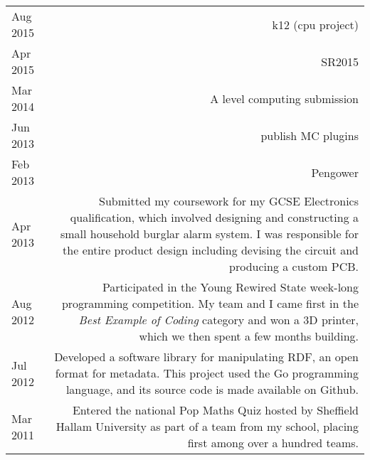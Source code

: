 

\begin{tabular}{L!{\sep}R}
    Aug 2015 & k12 (cpu project) \vspace{1.2em} \\

    Apr 2015 & SR2015 \vspace{1.2em} \\

    Mar 2014 & A level computing submission \vspace{1.2em} \\

    Jun 2013 & publish MC plugins \vspace{1.2em} \\

    Feb 2013 & Pengower \vspace{1.2em} \\

    Apr 2013 & Submitted my coursework for my GCSE Electronics qualification, which involved designing and constructing a small household burglar alarm system. I was responsible for the entire product design including devising the circuit and producing a custom PCB. \vspace{1.2em} \\

    Aug 2012 & Participated in the Young Rewired State week-long programming competition. My team and I came first in the \emph{Best Example of Coding} category and won a 3D printer, which we then spent a few months building. \vspace{1.2em} \\

    Jul 2012 & Developed a software library for manipulating RDF, an open format for metadata. This project used the Go programming language, and its source code is made available on Github. \vspace{1.2em} \\

    Mar 2011 & Entered the national Pop Maths Quiz hosted by Sheffield Hallam University as part of a team from my school, placing first among over a hundred teams. \\
\end{tabular}
